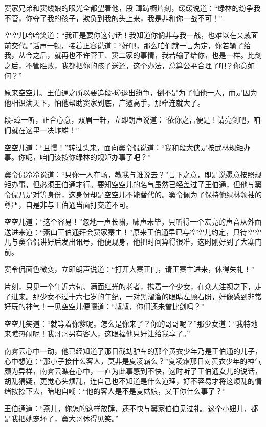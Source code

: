 \documentclass[12pt,oneside]{book}
\begin{document}
窦家兄弟和窦线娘的眼光全都望着他，段-璋踌橱片刻，缓缓说道：``绿林的纷争我不管，你夺了我的孩子，欺负到我的头上来，我是非和你一战不可！''

空空儿哈哈笑道：``我正是要你这句话！我知道你倘非与我一战，也难以在亲戚面前交代。''话声一顿，接着正容说道：``好吧，那么咱们就一言为定，你若输了给我，从今之后，就再也不许管王、窦二家的事情，我若输了给你，也是一样。比剑之后，不管胜败，我都把你的孩子送还，这个办法，总算公平合理了吧？你意如何？''

原来空空儿、王伯通之所以要追段-璋退出纷争，倒不是为了怕他一人，而是因为他相识满天下，怕他帮助窦家到底，广邀高手，那牵连就大了。

段-璋一听，正合心意，双眉一轩，立即朗声说道：``依你之言便是！请亮剑吧，咱们就在这里一决雌雄！''

空空儿道：``且慢！''转过头来，面向窦令侃说道：``我和段大侠是按武林规矩办事。你呢，咱们该按你绿林的规矩办事了吧？''

窦令侃冷冷说道：``只你一人在场，教我与谁说去？''言下之意，即是说愿意按照规矩办事，但必须王伯通才行。要知空空儿的名气虽然已经盖过了王伯通，但他与窦令侃乃是对等身份，这身份却是空空儿不能替代的。窦令佩为了保持他绿林领袖的尊严，自是非与王伯通当面打交道不可。

空空儿道：``这个容易！''忽地一声长啸，啸声未毕，只听得一个宏亮的声音从外面送进来道：``燕山王伯通拜会窦家寨主！''原来王伯通早已与空空儿约定，只待空空儿与窦令侃讲好后发出讯号，他便现身，他把时间算得很准，这时刚好到了大寨门前。

窦令侃面色微变，立即朗声说道：``打开大寨正门，请王寨主进来，休得失礼！''

片刻，只见一个年近六旬、满面红光的老者，携着一个少女，在众人注视之下，走了进来。那少女不过十六七岁的年纪，一对黑溜溜的眼睛左顾右盼，好像感到非常好玩的神气！一见空空儿便嚷道：``叔叔，你们还未曾比剑吗？''

空空儿笑道：``就等着你爹呢。怎么是你来了？你的哥哥呢？''那少女道：``我特地来瞧热闹呢！我哥哥另有客人，这眼福他只好让给我享了。''

南霁云心中一动，他已经知道了那日截劫驴车的那个黄衣少年乃是王伯通的儿子，心中想道：``那小子接什么客人，莫非是夏凌霜么？''夏凌霜那日对黄衣少年的神气颇为异样，南霁云瞧在心中，一直为此事感到不快，这时听了王伯通女儿的说话，胡乱猜疑，更觉心头烦乱，连自己也不知道是什么道理，好不容易才将这烦乱的情绪按捺下去，暗地自嘲：``他的客人是不是夏姑娘，又干你什么事了？''

王伯通道：``燕儿，你怎的这样放肆，还不快与窦家伯伯见过礼。这个小妞儿，都是我把她宠坏了，窦大哥休得见笑。''
\end{document}
